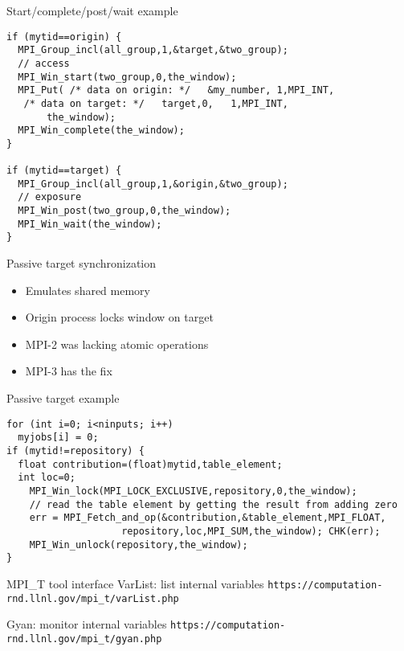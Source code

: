 \begin{frame}[fragile]{Start/complete/post/wait example}
\small
\begin{verbatim}
if (mytid==origin) {
  MPI_Group_incl(all_group,1,&target,&two_group);
  // access
  MPI_Win_start(two_group,0,the_window);
  MPI_Put( /* data on origin: */   &my_number, 1,MPI_INT,
   /* data on target: */   target,0,   1,MPI_INT,
	   the_window);
  MPI_Win_complete(the_window);
}

if (mytid==target) {
  MPI_Group_incl(all_group,1,&origin,&two_group);
  // exposure
  MPI_Win_post(two_group,0,the_window);
  MPI_Win_wait(the_window);
}
\end{verbatim}
\end{frame}

\begin{frame}{Passive target synchronization}
\begin{itemize}
\item Emulates shared memory
\item Origin process locks window on target
\item MPI-2 was lacking atomic operations
\item MPI-3 has the fix
\end{itemize}
\end{frame}

\begin{frame}[fragile]{Passive target example}
\small
\begin{verbatim}
for (int i=0; i<ninputs; i++) 
  myjobs[i] = 0;
if (mytid!=repository) {
  float contribution=(float)mytid,table_element;
  int loc=0;
    MPI_Win_lock(MPI_LOCK_EXCLUSIVE,repository,0,the_window);
    // read the table element by getting the result from adding zero
    err = MPI_Fetch_and_op(&contribution,&table_element,MPI_FLOAT,
     	            repository,loc,MPI_SUM,the_window); CHK(err);
    MPI_Win_unlock(repository,the_window);
}
\end{verbatim}
\end{frame}

\begin{frame}[fragile]{MPI\_T tool interface}
VarList: list internal variables
\texttt{https://computation-rnd.llnl.gov/mpi_t/varList.php}

Gyan: monitor internal variables
\texttt{https://computation-rnd.llnl.gov/mpi_t/gyan.php}
\end{frame}
